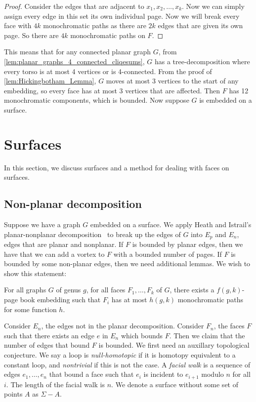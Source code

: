 \begin{proof}
	Consider the edges that are adjacent to \(x_1, x_2, \ldots, x_k \). Now we can simply assign every edge in this set its own individual page. Now we will break every face with $4k$ monochromatic paths as there are $2k$ edges that are given its own page. So there are $4k$ monochromatic paths on $F$.
\end{proof}

This means that for any connected planar graph \(G \), from \cref{lem:planar_graphs_4_connected_cliqesums}, \(G\) has a tree-decomposition where every torso is at most 4 vertices or is 4-connected. From the proof of \cref{lem:Hickingbotham_Lemma}, \(G\) moves at most 3 vertices to the start of any embedding, so every face has at most 3 vertices that are affected. Then \(F \) has 12 monochromatic components, which is bounded. Now suppose $G$ is embedded on a surface.

\section{Surfaces}
In this section, we discuss surfaces and a method for dealing with faces on surfaces.
\subsection{Non-planar decomposition}
Suppose we have a graph \(G\) embedded on a surface. We apply Heath and Istrail's planar-nonplanar decomposition~\cite{heathPagenumberGenusGraphs1992} to break up the edges of \(G\) into \(E_p\) and \(E_n\), edges that are planar and nonplanar. If \(F\) is bounded by planar edges, then we have that we can add a vortex to \(F\) with a bounded number of pages. If \(F\) is bounded by some non-planar edges, then we need additional lemmas.
We wish to show this statement:
\begin{theorem}
	For all graphs \(G\) of genus \(g\), for all faces \(F_1, \ldots, F_k\) of \(G\), there exists a \(f(g, k)\)-page book embedding such that \(F_i\) has at most \( h(g, k)\) monochromatic paths for some function $h$.
\end{theorem}
Consider \(E_n\), the edges not in the planar decomposition. Consider \(F_n\), the faces \(F\) such that there exists an edge \(e\) in \(E_n\) which bounds \(F\). Then we claim that the number of edges that bound \(F\) is bounded. We first need an auxillary topological conjecture. We say a loop is \textit{null-homotopic} if it is homotopy equivalent to a constant loop, and \textit{nontrivial} if this is not the case. A \textit{facial walk} is a sequence of edges \(e_1, \ldots, e_n\) that bound a face such that \(e_i\) is incident to \(e_{i + 1}\) modulo \(n\) for all \(i\). The length of the facial walk is \(n\). We denote a surface without some set of points $A$ as $\Sigma - A$. 

